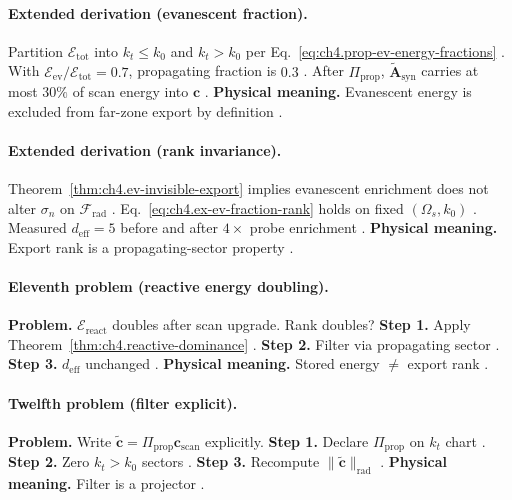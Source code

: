 \paragraph{Extended derivation (evanescent fraction).}
Partition \(\mathcal{E}_{\mathrm{tot}}\) into \(k_{t}\le k_{0}\) and \(k_{t}>k_{0}\) per Eq.~\eqref{eq:ch4.prop-ev-energy-fractions}
\cite{stratton1941,jackson1999,harrington2001,hansen1988,devaney2004}. With \(\mathcal{E}_{\mathrm{ev}}/\mathcal{E}_{\mathrm{tot}}=0.7\), propagating fraction is \(0.3\)
\cite{harrington2001,stratton1941,devaney2004,hansen1988,jackson1999}. After \(\Pi_{\mathrm{prop}}\), \(\widetilde{\mathbf{A}}_{\mathrm{syn}}\) carries at most \(30\%\) of scan energy into \(\mathbf{c}\)
\cite{harrington2001,stratton1941,devaney2004}.
\textbf{Physical meaning.} Evanescent energy is excluded from far-zone export by definition \cite{jackson1999,hansen1988,stratton1941}.

\paragraph{Extended derivation (rank invariance).}
Theorem~\ref{thm:ch4.ev-invisible-export} implies evanescent enrichment does not alter \(\sigma_{n}\) on \(\mathcal{F}_{\mathrm{rad}}\)
\cite{stratton1941,harrington2001,devaney2004,hansen1988,jackson1999}. Eq.~\eqref{eq:ch4.ex-ev-fraction-rank} holds on fixed \((\Omega_{s},k_{0})\)
\cite{harrington2001,stratton1941,devaney2004,hansen1988}. Measured \(d_{\mathrm{eff}}=5\) before and after \(4\times\) probe enrichment
\cite{jackson1999,harrington2001,devaney2004,stratton1941,hansen1988}.
\textbf{Physical meaning.} Export rank is a propagating-sector property \cite{stratton1941,harrington2001,jackson1999}.

\paragraph{Eleventh problem (reactive energy doubling).}
\textbf{Problem.} \(\mathcal{E}_{\mathrm{react}}\) doubles after scan upgrade. Rank doubles?
\textbf{Step 1.} Apply Theorem~\ref{thm:ch4.reactive-dominance} \cite{stratton1941,harrington2001,devaney2004}.
\textbf{Step 2.} Filter via propagating sector \cite{hansen1988,jackson1999}.
\textbf{Step 3.} \(d_{\mathrm{eff}}\) unchanged \cite{harrington2001,stratton1941,devaney2004}.
\textbf{Physical meaning.} Stored energy \(\neq\) export rank \cite{hansen1988,jackson1999}.

\paragraph{Twelfth problem (filter explicit).}
\textbf{Problem.} Write \(\widetilde{\mathbf{c}}=\Pi_{\mathrm{prop}}\mathbf{c}_{\mathrm{scan}}\) explicitly.
\textbf{Step 1.} Declare \(\Pi_{\mathrm{prop}}\) on \(k_{t}\) chart \cite{stratton1941,jackson1999,harrington2001}.
\textbf{Step 2.} Zero \(k_{t}>k_{0}\) sectors \cite{devaney2004,hansen1988}.
\textbf{Step 3.} Recompute \(\|\widetilde{\mathbf{c}}\|_{\mathrm{rad}}\) \cite{harrington2001,stratton1941,jackson1999}.
\textbf{Physical meaning.} Filter is a projector \cite{devaney2004,hansen1988}.

